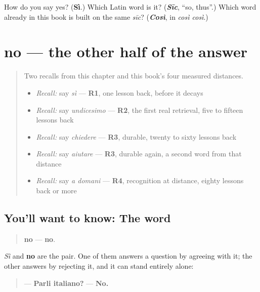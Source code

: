 \begin{tcolorbox}[breakable,colback=teal!4,colframe=teal!35!black,title={Before you move on}]
How do you say yes? (\textbf{Sì}.) Which Latin word is it? (\emph{\textbf{Sīc}}, \textquotedblleft{}so, thus\textquotedblright{}.) Which word already in this book is built on the same \emph{sīc}? (\emph{\textbf{Così}}, in \emph{così così}.)
\end{tcolorbox}
\section[no]{no — the other half of the answer}

\label{lesson:IT-C29-no}



\begin{quote}
Two recalls from this chapter and this book's four measured distances.

\begin{itemize}
\raggedright
  \item \emph{Recall:} say \emph{sì} — \textbf{R1}, one lesson back, before it decays
  \item \emph{Recall:} say \emph{undicesimo} — \textbf{R2}, the first real retrieval, five to fifteen lessons back
  \item \emph{Recall:} say \emph{chiedere} — \textbf{R3}, durable, twenty to sixty lessons back
  \item \emph{Recall:} say \emph{aiutare} — \textbf{R3}, durable again, a second word from that distance
  \item \emph{Recall:} say \emph{a domani} — \textbf{R4}, recognition at distance, eighty lessons back or more
\end{itemize}
\end{quote}

\subsection*{You'll want to know: The word}
\begin{quote}
\textbf{no} — \textbf{no}.
\end{quote}

\emph{Sì} and \textbf{no} are the pair. One of them answers a question by agreeing with it; the other answers by rejecting it, and it can stand entirely alone:

\begin{quote}
— \textbf{Parli italiano?} — \textbf{No.}
\end{quote}


